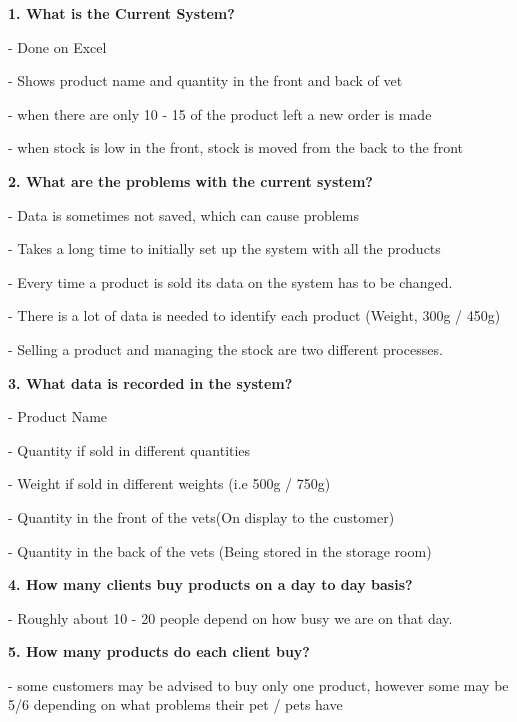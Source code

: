 	\begin{flushleft}

\textbf{1. What is the Current System?} \par
- Done on Excel\par
- Shows product name and quantity in the front and back of vet\par
- when there are only 10 - 15 of the product left a new order is made\par
- when stock is low in the front, stock is moved from the back to the front\par

\textbf{2. What are the problems with the current system?}\par
- Data is sometimes not saved, which can cause problems\par
- Takes a long time to initially set up the system with all the products\par
- Every time a product is sold its data on the system has to be changed.\par
- There is a lot of data is needed to identify each product (Weight, 300g / 450g)\par
- Selling a product and managing the stock are two different processes.\par

\textbf{3. What data is recorded in the system?}\par
- Product Name\par
- Quantity if sold in different quantities\par
- Weight if sold in different weights (i.e 500g / 750g)\par
- Quantity in the front of the vets(On display to the customer)\par
- Quantity in the back of the vets (Being stored in the storage room)\par

\textbf{4. How many clients buy products on a day to day basis?}\par
- Roughly about 10 - 20 people depend on how busy we are on that day.\par

\textbf{5. How many products do each client buy?}\par
- some customers may be advised to buy only one product, however some may be 5/6 depending on what problems their pet / pets have\par


\end{flushleft}
